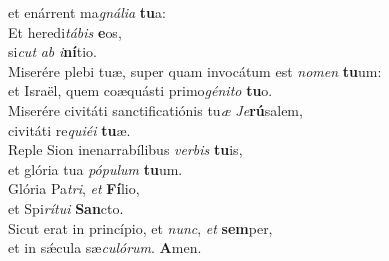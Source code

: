 \evenverse et enárrent ma\textit{gná}\textit{li}\textit{a} \textbf{tu}a:\\
\oddverse Et heredi\textit{tá}\textit{bis} \textbf{e}os,~\*\\
\oddverse si\textit{cut} \textit{ab} \textit{i}\textbf{ní}tio.\\
\evenverse Miserére plebi tuæ, super quam invocátum est \textit{no}\textit{men} \textbf{tu}um:~\*\\
\evenverse et Israël, quem coæquásti primo\textit{gé}\textit{ni}\textit{to} \textbf{tu}o.\\
\oddverse Miserére civitáti sanctificatiónis tu\textit{æ} \textit{Je}\textbf{rú}salem,~\*\\
\oddverse civitáti re\textit{qui}\textit{é}\textit{i} \textbf{tu}æ.\\
\evenverse Reple Sion inenarrabílibus \textit{ver}\textit{bis} \textbf{tu}is,~\*\\
\evenverse et glória tua \textit{pó}\textit{pu}\textit{lum} \textbf{tu}um.\\
\oddverse Glória Pa\textit{tri}, \textit{et} \textbf{Fí}lio,~\*\\
\oddverse et Spi\textit{rí}\textit{tu}\textit{i} \textbf{San}cto.\\
\evenverse Sicut erat in princípio, et \textit{nunc}, \textit{et} \textbf{sem}per,~\*\\
\evenverse et in sǽcula sæ\textit{cu}\textit{ló}\textit{rum}. \textbf{A}men.\\

